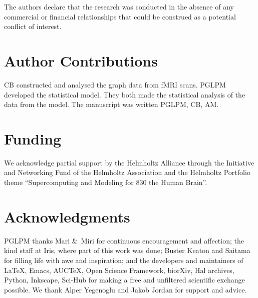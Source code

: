 \documentclass[%
]{frontiersSCNS-nologo} %
\newcommand*{\amp}{\&}
\renewcommand*{\|}{\mathpunct{|}}%
\begin{document}
The authors declare that the research was conducted in the absence of any
commercial or financial relationships that could be construed as a
potential conflict of interest.

\section*{Author Contributions}

CB constructed and analysed the graph data from fMRI scans. PGLPM developed
the statistical model. They both made the statistical analysis of the data
from the model. The manuscript was written PGLPM, CB, AM.

\section*{Funding}

We acknowledge partial support by the Helmholtz Alliance through the
Initiative and Networking Fund of the Helmholtz Association and the
Helmholtz Portfolio theme \enquote{Supercomputing and Modeling for 830 the
  Human Brain}.

\section*{Acknowledgments}

PGLPM thanks Mari \amp\ Miri for continuous encouragement
and affection; the kind staff at Iris, where part of this work was done;
Buster Keaton and Saitama for filling life with awe and inspiration; and
the developers and maintainers of \LaTeX, Emacs, AUC\TeX, Open Science
Framework, biorXiv, Hal archives, Python, Inkscape, Sci-Hub for making a
free and unfiltered scientific exchange possible. We thank Alper Yegenoglu
and Jakob Jordan for support and advice.
\end{document}
